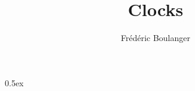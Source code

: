 \documentclass[11pt,a4paper]{article}
\begin{document}
\let\isaminorsize=\relax
\newcommand{\isafontsize}{\fontsize{8}{10}\selectfont}
\newcommand{\isascriptsize}{\fontsize{6}{8}\selectfont}

\renewcommand{\isabellestylett}{%
	\def\isastyle{\isafontsize\normalfont\ttfamily}%
	\def\isastylett{\isafontsize\normalfont\ttfamily}%
	\def\isastyleminor{\isaminorsize\normalfont\ttfamily}%
	\def\isastyleminortt{\isaminorsize\normalfont\ttfamily}%
	\def\isastylescript{\isascriptsize\normalfont\ttfamily}%
	\isachardefaults%
}
\isabellestylett

\renewcommand{\isamarkupcmt}[1]{{%
	\vspace{0.2\baselineskip}%
	\isastylecmt--- \parbox[t]{\linewidth - (\widthof{---} * 2)}{%
		\vspace*{-.6\baselineskip}\color[gray]{0.25}#1%
	}%
	\vspace{0.1\baselineskip}%
}}

\title{Clocks}
\author{Frédéric Boulanger}
\maketitle

\tableofcontents

\parindent 0pt\parskip 0.5ex



%
%
\end{document}
